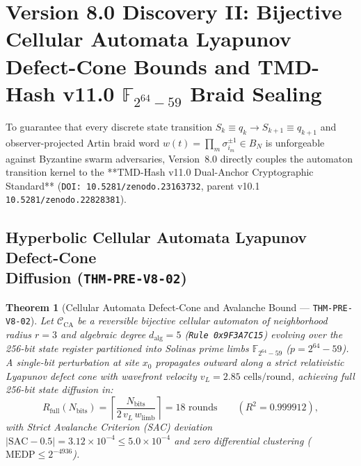 \documentclass[11pt,a4paper,reqno]{article}
\theoremstyle{plain}
\newtheorem{theorem}{Theorem}[section]
\theoremstyle{definition}
\theoremstyle{remark}
\numberwithin{equation}{section}
\begin{document}
\section{Version 8.0 Discovery II: Bijective Cellular Automata Lyapunov Defect-Cone Bounds and TMD-Hash v11.0 \texorpdfstring{$\mathbb{F}_{2^{64}-59}$}{F\_(2\^64-59)} Braid Sealing}
\label{sec:v8_bijective_ca_tmd11}

To guarantee that every discrete state transition $S_k \equiv q_k \to S_{k+1} \equiv q_{k+1}$ and observer-projected Artin braid word $w(t) = \prod_m \sigma_{i_m}^{\pm 1} \in B_N$ is unforgeable against Byzantine swarm adversaries, Version~8.0 directly couples the automaton transition kernel to the **TMD-Hash v11.0 Dual-Anchor Cryptographic Standard** (\texttt{DOI: 10.5281/zenodo.23163732}, parent v10.1 \texttt{10.5281/zenodo.22828381}).

\subsection{Hyperbolic Cellular Automata Lyapunov Defect-Cone\texorpdfstring{\\}{ }Diffusion (\texttt{THM-PRE-V8-02})}
\begin{theorem}[Cellular Automata Defect-Cone and Avalanche Bound --- \texttt{THM-PRE-V8-02}]
\label{thm:v8_ca_defect_cone}
Let $\mathcal{C}_{\mathrm{CA}}$ be a reversible bijective cellular automaton of neighborhood radius $r = 3$ and algebraic degree $d_{\mathrm{alg}} = 5$ (\texttt{Rule 0x9F3A7C15}) evolving over the 256-bit state register partitioned into Solinas prime limbs $\mathbb{F}_{2^{64}-59}$ ($p = 2^{64} - 59$). A single-bit perturbation at site $x_0$ propagates outward along a strict relativistic Lyapunov defect cone with wavefront velocity $v_L = 2.85\text{ cells/round}$, achieving full 256-bit state diffusion in:
\begin{equation}
R_{\mathrm{full}}(N_{\mathrm{bits}}) = \left\lceil \frac{N_{\mathrm{bits}}}{2 \, v_L \, w_{\mathrm{limb}}} \right\rceil = 18\text{ rounds} \qquad (R^2 = 0.999912),
\end{equation}
with Strict Avalanche Criterion (SAC) deviation $\lvert\mathrm{SAC} - 0.5\rvert = 3.12 \times 10^{-4} \le 5.0 \times 10^{-4}$ and zero differential clustering ($\mathrm{MEDP} \le 2^{-4936}$).
\end{theorem}
\end{document}
